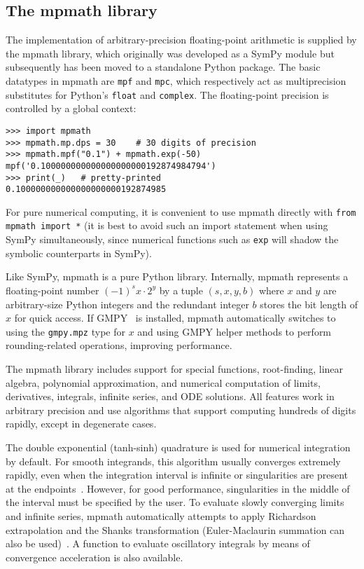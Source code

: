 \subsection{The mpmath library}

The implementation of arbitrary-precision floating-point arithmetic
is supplied by the mpmath library, which originally was developed
as a SymPy module but subsequently has been
moved to a standalone Python package. The basic datatypes in mpmath
are \texttt{mpf} and \texttt{mpc}, which respectively act as
multiprecision substitutes for Python's \texttt{float} and \texttt{complex}.
The floating-point precision is controlled by a global context:

\begin{verbatim}
>>> import mpmath
>>> mpmath.mp.dps = 30    # 30 digits of precision
>>> mpmath.mpf("0.1") + mpmath.exp(-50)
mpf('0.100000000000000000000192874984794')
>>> print(_)   # pretty-printed
0.100000000000000000000192874985
\end{verbatim}

For pure numerical computing, it is convenient to use mpmath directly
with \texttt{from mpmath import *} (it is best to avoid such an
import statement when using SymPy simultaneously, since numerical
functions such as \texttt{exp} will shadow the symbolic counterparts
in SymPy).

Like SymPy, mpmath is a pure Python library.
Internally, mpmath represents a floating-point number
${(-1)}^s x \cdot 2^y$ by a tuple $(s, x, y, b)$ where
$x$ and $y$ are arbitrary-size Python integers
and the redundant integer $b$ stores the bit length of $x$ for quick access.
If GMPY~\cite{GMPY} is installed, mpmath automatically switches to
using the \texttt{gmpy.mpz} type for $x$ and using GMPY helper methods
to perform rounding-related operations, improving performance.

The mpmath library includes support for
special functions, root-finding, linear algebra, polynomial approximation,
and numerical computation of limits, derivatives, integrals, infinite
series, and ODE solutions. All features work in arbitrary precision
and use algorithms that support computing hundreds of digits rapidly,
except in degenerate cases.

The double exponential (tanh-sinh) quadrature is used for numerical
integration by default. For smooth integrands, this algorithm usually
converges extremely rapidly, even when the integration interval is infinite
or singularities are present at the endpoints~\cite{takahasi1974double,bailey2005comparison}.
However, for good performance, singularities
in the middle of the interval must be specified
by the user.
To evaluate slowly converging limits and infinite series, mpmath
automatically attempts to apply Richardson extrapolation and the
Shanks transformation
(Euler-Maclaurin summation can also be used)~\cite{BenderOrszag1999}.
A function to evaluate oscillatory integrals by means of convergence
acceleration is also available.

